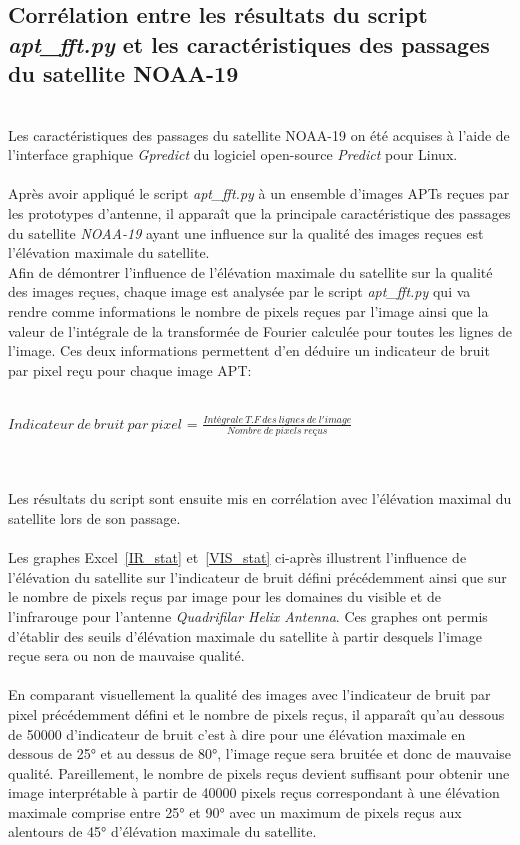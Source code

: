 \documentclass[12pt,fleqn]{book} %
\begin{document}
\subsection{Corrélation entre les résultats du script \emph{apt\_fft.py} et les caractéristiques des passages du satellite NOAA-19}
~\\Les caractéristiques des passages du satellite NOAA-19 on été acquises à l'aide de l'interface graphique \emph{Gpredict} du logiciel open-source \emph{Predict} pour Linux.
~\\\\Après avoir appliqué le script \emph{apt\_fft.py} à un ensemble d'images APTs reçues par les prototypes d'antenne, il apparaît que la principale caractéristique des passages du satellite \emph{NOAA-19} ayant une influence sur la qualité des images reçues est l'élévation maximale du satellite.
~\\Afin de démontrer l'influence de l'élévation maximale du satellite sur la qualité des images reçues, chaque image est analysée par le script \emph{apt\_fft.py} qui va rendre comme informations le nombre de pixels reçues par l'image ainsi que la valeur de l'intégrale de la transformée de Fourier calculée pour toutes les lignes de l'image.
Ces deux informations permettent d'en déduire un indicateur de bruit par pixel reçu pour chaque image APT:
~\\\\
\begin{center}
 $ Indicateur\ de\ bruit\ par\ pixel $ = $\frac{Intégrale\ T.F\ des\ lignes\ de\ l'image}{Nombre\ de\ pixels\ reçus} $
\end{center}
~\\\\
Les résultats du script sont ensuite mis en corrélation avec l'élévation maximal du satellite lors de son passage. 
~\\\\Les graphes Excel~\underline{\color{blue}\ref{IR_stat}} et~\underline{\color{blue}\ref{VIS_stat}} ci-après illustrent l'influence de l'élévation du satellite sur l'indicateur de bruit défini précédemment ainsi que sur le nombre de pixels reçus par image pour les domaines du visible et de l'infrarouge pour l'antenne \emph{Quadrifilar Helix Antenna}.
Ces graphes ont permis d'établir des seuils d'élévation maximale du satellite à partir desquels l'image reçue sera ou non de mauvaise qualité. 
~\\\\En comparant visuellement la qualité des images avec l'indicateur de bruit par pixel précédemment défini et le nombre de pixels reçus, il apparaît qu'au dessous de 50000 d'indicateur de bruit c'est à dire pour une élévation maximale en dessous de 25° et au dessus de 80°, l'image reçue sera bruitée et donc de mauvaise qualité. Pareillement, le nombre de pixels reçus devient suffisant pour obtenir une image interprétable à partir de 40000 pixels reçus correspondant à une élévation maximale comprise entre 25° et 90° avec un maximum de pixels reçus aux alentours de 45° d'élévation maximale du satellite.  
\end{document}
